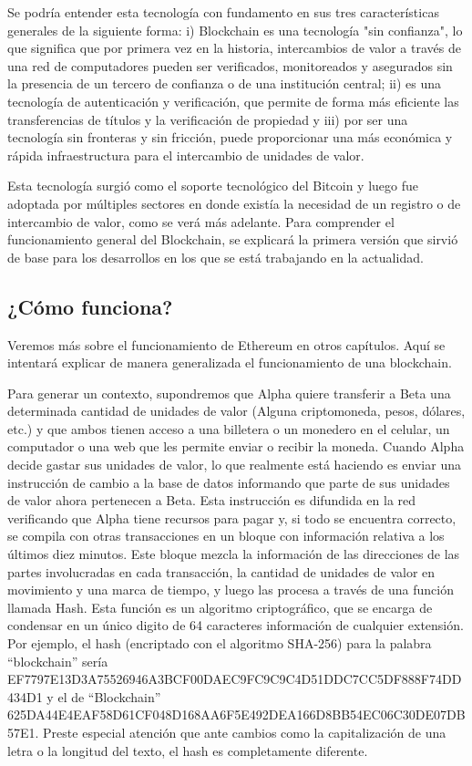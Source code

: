 Se podría entender esta tecnología con fundamento en sus tres características generales de la
siguiente forma: i) Blockchain es una tecnología "sin confianza", lo que significa que por primera
vez en la historia, intercambios de valor a través de una red de computadores pueden ser
verificados, monitoreados y asegurados sin la presencia de un tercero de confianza o
de una institución central; ii) es una tecnología de autenticación y verificación, que permite de
forma más eficiente las transferencias de títulos y la verificación de propiedad y iii) por ser una
tecnología sin fronteras y sin fricción, puede proporcionar una más económica y rápida
infraestructura para el intercambio de unidades de valor.

Esta tecnología surgió como el soporte tecnológico del Bitcoin y luego fue adoptada por múltiples
sectores en donde existía la necesidad de un registro o de intercambio de valor, como se verá más
adelante. Para comprender el funcionamiento general del Blockchain, se explicará la primera versión
que sirvió de base para los desarrollos en los que se está trabajando en la actualidad.


\subsection{¿Cómo funciona?}
Veremos más sobre el funcionamiento de Ethereum en otros capítulos. Aquí se intentará explicar de 
manera generalizada el funcionamiento de una blockchain.

Para generar un contexto, supondremos que Alpha quiere transferir a Beta una determinada
cantidad de unidades de valor (Alguna criptomoneda, pesos, dólares, etc.) y que ambos tienen acceso
a una billetera o un monedero en el celular, un computador o una web que les permite enviar o
recibir la moneda. Cuando Alpha decide gastar sus unidades de valor, lo que realmente está haciendo
es enviar una instrucción de cambio a la base de datos informando que parte de sus unidades de
valor ahora pertenecen a Beta. Esta instrucción es difundida en la red verificando que Alpha tiene
recursos para pagar y, si todo se encuentra correcto, se compila con otras transacciones
en un bloque con información relativa a los últimos diez minutos.
Este bloque mezcla la información de las direcciones de las partes involucradas en cada
transacción, la cantidad de unidades de valor en movimiento y una marca de tiempo, y luego las
procesa a través de una función llamada Hash. Esta función es un algoritmo criptográfico, que se
encarga de condensar en un único digito de 64 caracteres información de cualquier extensión.
Por ejemplo, el hash (encriptado con el algoritmo SHA-256) para la palabra “blockchain” sería
EF7797E13D3A75526946A3BCF00DAEC9FC9C9C4D51DDC7CC5DF888F74DD434D1 y el de “Blockchain”
625DA44E4EAF58D61CF048D168AA6F5E492DEA166D8BB54EC06C30DE07DB57E1. Preste especial atención que ante
cambios como la capitalización de una letra o la longitud del texto, el hash es completamente
diferente.

